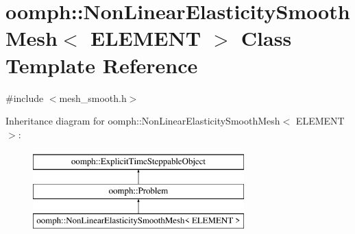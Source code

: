 \hypertarget{classoomph_1_1NonLinearElasticitySmoothMesh}{}\section{oomph\+:\+:Non\+Linear\+Elasticity\+Smooth\+Mesh$<$ E\+L\+E\+M\+E\+NT $>$ Class Template Reference}
\label{classoomph_1_1NonLinearElasticitySmoothMesh}


{\ttfamily \#include $<$mesh\+\_\+smooth.\+h$>$}

Inheritance diagram for oomph\+:\+:Non\+Linear\+Elasticity\+Smooth\+Mesh$<$ E\+L\+E\+M\+E\+NT $>$\+:\begin{figure}[H]
\begin{center}
\leavevmode
\includegraphics[height=3.000000cm]{classoomph_1_1NonLinearElasticitySmoothMesh}
\end{center}
\end{figure}
